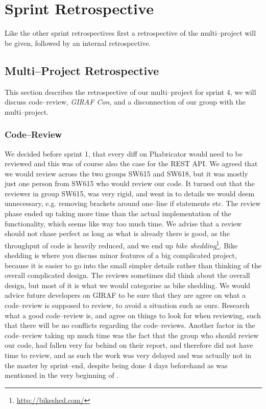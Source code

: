 \section{Sprint Retrospective}
\label{sec:S4retro} %

Like the other sprint retrospectives first a retrospective of the multi--project will be given, followed by an internal retrospective.

\subsection*{Multi--Project Retrospective}
This section describes the retrospective of our multi--project for sprint 4, we will discuss code--review, \textit{GIRAF Con}, and a disconnection of our group with the multi--project.

\subsubsection*{Code--Review}
We decided before sprint 1, that every diff on Phabricator would need to be reviewed and this was of course also the case for the REST API.
We agreed that we would review across the two groups SW615 and SW618, but it was mostly just one person from SW615 who would review our code.
It turned out that the reviewer in group SW615, was very rigid, and went in to details we would deem unnecessary, e.g. removing brackets around one--line if statements etc.
The review phase ended up taking more time than the actual implementation of the functionality, which seems like way too much time.
We advise that a review should not chase perfect as long as what is already there is good, as the throughput of code is heavily reduced, and we end up \textit{bike shedding}\footnote{\url{http://bikeshed.com/}}.
Bike shedding is where you discuss minor features of a big complicated project, because it is easier to go into the small simpler details rather than thinking of the overall complicated design.
The reviews sometimes did think about the overall design, but most of it is what we would categorise as bike shedding.
We would advice future developers on GIRAF to be sure that they are agree on what a code--review is supposed to review, to avoid a situation such as ours.
Research what a good code--review is, and agree on things to look for when reviewing, such that there will be no conflicts regarding the code--reviews.
Another factor in the code--review taking up much time was the fact that the group who should review our code, had fallen very far behind on their report, and therefore did not have time to review, and as such the work was very delayed and was actually not in the master by sprint--end, despite being done 4 days beforehand as was mentioned in the very beginning of .


